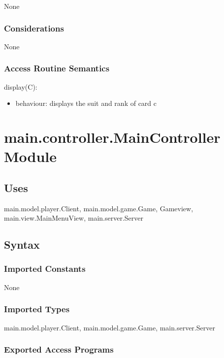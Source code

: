 \documentclass[12pt, titlepage]{article}
\begin{document}
None

\subsubsection* {Considerations}

None

\subsubsection* {Access Routine Semantics}

\noindent display(C):
\begin{itemize}
\item behaviour: displays the suit and rank of card c
\end{itemize}


\section* {main.controller.MainController Module}
    \subsection* {Uses}
        main.model.player.Client, main.model.game.Game, Gameview, main.view.MainMenuView, main.server.Server
    \subsection* {Syntax}
    
        \subsubsection* {Imported Constants}
            None
        \subsubsection* {Imported Types}
            main.model.player.Client, main.model.game.Game, main.server.Server
        \subsubsection* {Exported Access Programs}
        
\end{document}
